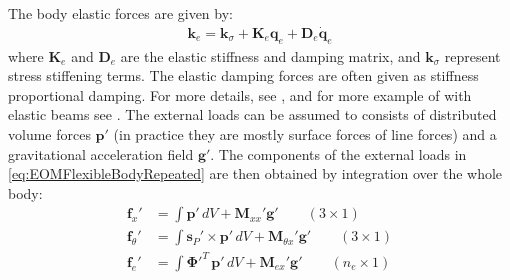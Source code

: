 \documentclass[wes, manuscript]{copernicus}
\renewcommand{\v}[1]{\boldsymbol{#1}}
\newcommand{\m}[1]{\boldsymbol{#1}}
\begin{document}
% 
The body elastic forces are given by:
\begin{align}
  \v{k}_e =  \v{k}_\sigma + \m{K}_e \v{q}_e  + \m{D}_e \v{\dot{q}}_e     %
\end{align}
where $\m{K}_e$ and $\m{D}_e$ are the elastic stiffness and damping matrix, and $\v{k}_\sigma$ represent stress stiffening terms. 
The elastic damping forces are often given as stiffness proportional damping.
For more details, see \cite{Wallrapp:1994}, and for more example of with elastic beams see \cite{branlard:2019flex}.
% 
The external loads can be assumed to consists of distributed volume forces $\v{p}'$ (in practice they are mostly surface forces of line forces) and a gravitational acceleration field $\v{g}'$. The components of the external loads
  in  \autoref{eq:EOMFlexibleBodyRepeated} are then obtained by integration over the whole body:
\begin{align}
    \v{f}_x'&=\int \v{p}' \, dV
        + \m{M}_{xx}'\v{g'}
        \qquad (3\times 1)
            \label{eq:genQgeneral}
    \\
    \v{f}_\theta'&=\int \v{s}_P'\times\v{p}' \, dV
        + \m{M}_{\theta x}'\v{g'}
        \qquad (3\times 1)
    \\
    \v{f}_e'&=\int {\m{\Phi}'}^T\, \v{p}' \, dV
        + \m{M}_{e x}'\v{g'}
        \qquad (n_e\times 1)
\end{align}



\end{document}
